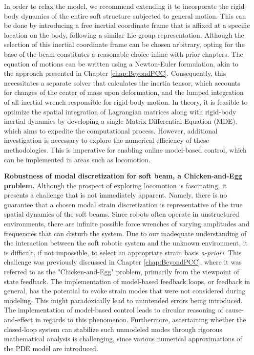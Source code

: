 In order to relax the model, we recommend extending it to incorporate the rigid-body dynamics of the entire soft structure subjected to general motion. This can be done by introducing a free inertial coordinate frame that is affixed at a specific location on the body, following a similar  Lie group representation. Although the selection of this inertial coordinate frame can be chosen arbitrary, opting for the base of the beam constitutes a reasonable choice inline with prior chapters. The equation of motions can be written using a Newton-Euler formulation, akin to the approach presented in Chapter \ref{chap:BeyondPCC}. Consequently, this necessitates a separate solver that calculates the inertia tensor, which accounts for changes of the center of mass upon deformation, and the lumped integration of all inertial wrench responsible for rigid-body motion. In theory, it is feasible to optimize the spatial integration of Lagrangian matrices along with rigid-body inertial dynamics by developing a single Matrix Differential Equation (MDE), which aims to expedite the computational process. However, additional investigation is necessary to explore the numerical efficiency of these methodologies. This is imperative for enabling online model-based control, which can be implemented in areas such as locomotion. %

\textbf{Robustness of modal discretization for soft beam, a Chicken-and-Egg problem.} Although the prospect of exploring locomotion is fascinating, it presents a challenge that is not immediately apparent. Namely, there is no guarantee that a chosen modal strain discretization is representative of the true spatial dynamics of the soft beams. Since robots often operate in unstructured environments, there are infinite possible force wrenches of varying amplitudes and frequencies that can disturb the system. Due to our inadequate understanding of the interaction between the soft robotic system and the unknown environment, it is difficult, if not impossible, to select an appropriate strain basis \textit{a-priori}. This challenge was previously discussed in Chapter \ref{chap:BeyondPCC}, where it was referred to as the "Chicken-and-Egg" problem, primarily from the viewpoint of state feedback. The implementation of model-based feedback loops, or feedback in general, has the potential to evoke strain modes that were not considered during modeling. This might paradoxically lead to unintended errors being introduced. The implementation of model-based control leads to circular reasoning of cause-and-effect in regards to this phenomenon. Furthermore, ascertaining whether the closed-loop system can stabilize such unmodeled modes through rigorous mathematical analysis is challenging, since various numerical approximations of the PDE model are introduced.

